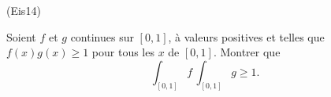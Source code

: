 \begin{tiny}(Eis14)\end{tiny} Soient $f$ et $g$ continues sur $[0,1]$, à valeurs positives et telles que $f(x)g(x)\geq1$ pour tous les $x$ de $[0,1]$. Montrer que
\begin{displaymath}
 \int_{[0,1]}f\,\int_{[0,1]}g \geq 1.
\end{displaymath}
